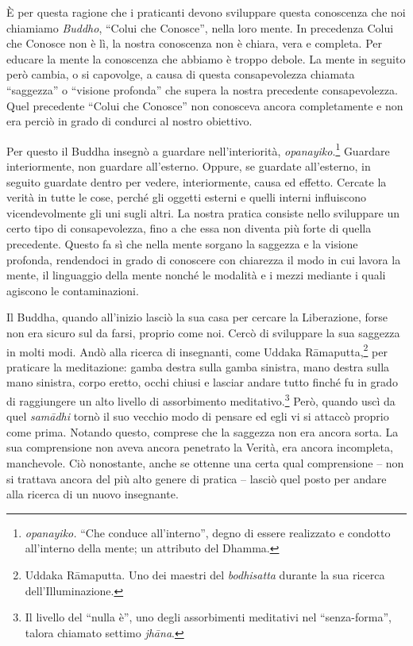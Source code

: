 È per questa ragione che i praticanti devono sviluppare questa
conoscenza che noi chiamiamo \emph{Buddho}, ``Colui che Conosce'', nella
loro mente. In precedenza Colui che Conosce non è lì, la nostra
conoscenza non è chiara, vera e completa. Per educare la mente la
conoscenza che abbiamo è troppo debole. La mente in seguito però cambia,
o si capovolge, a causa di questa consapevolezza chiamata ``saggezza'' o
``visione profonda'' che supera la nostra precedente consapevolezza.
Quel precedente ``Colui che Conosce'' non conosceva ancora completamente
e non era perciò in grado di condurci al nostro obiettivo.

Per questo il Buddha insegnò a guardare nell'interiorità,
\emph{opanayiko}.\footnote{\emph{opanayiko.} ``Che conduce
  all'interno'', degno di essere realizzato e condotto all'interno
  della mente; un attributo del Dhamma.} Guardare interiormente, non
guardare all'esterno. Oppure, se guardate all'esterno, in seguito
guardate dentro per vedere, interiormente, causa ed effetto. Cercate la
verità in tutte le cose, perché gli oggetti esterni e quelli interni
influiscono vicendevolmente gli uni sugli altri. La nostra pratica
consiste nello sviluppare un certo tipo di consapevolezza, fino a che
essa non diventa più forte di quella precedente. Questo fa sì che nella
mente sorgano la saggezza e la visione profonda, rendendoci in grado di
conoscere con chiarezza il modo in cui lavora la mente, il linguaggio
della mente nonché le modalità e i mezzi mediante i quali agiscono le
contaminazioni.

Il Buddha, quando all'inizio lasciò la sua casa per cercare la
Liberazione, forse non era sicuro sul da farsi, proprio come noi. Cercò
di sviluppare la sua saggezza in molti modi. Andò alla ricerca di
insegnanti, come Uddaka Rāmaputta,\footnote{Uddaka Rāmaputta. Uno dei
  maestri del \emph{bodhisatta} durante la sua ricerca
  dell'Illuminazione.} per praticare la meditazione: gamba destra sulla
gamba sinistra, mano destra sulla mano sinistra, corpo eretto, occhi
chiusi e lasciar andare tutto finché fu in grado di raggiungere un alto
livello di assorbimento meditativo.\footnote{Il livello del ``nulla è'',
  uno degli assorbimenti meditativi nel ``senza-forma'', talora chiamato
  settimo \emph{jhāna}.} Però, quando uscì da quel \emph{samādhi} tornò
il suo vecchio modo di pensare ed egli vi si attaccò proprio come prima.
Notando questo, comprese che la saggezza non era ancora sorta. La sua
comprensione non aveva ancora penetrato la Verità, era ancora
incompleta, manchevole. Ciò nonostante, anche se ottenne una certa qual
comprensione -- non si trattava ancora del più alto genere di pratica --
lasciò quel posto per andare alla ricerca di un nuovo insegnante.

